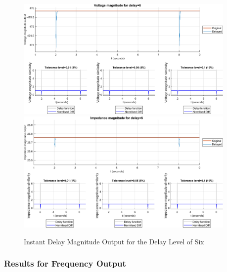 \begin{figure}
    \caption{Instant Delay Magnitude Output for the Delay Level of Six}
    \includegraphics[width=0.95\textwidth]{PMUsim-figures/DelayOf_6/Instant_vMagnitude.png}    
      \includegraphics[width=0.95\textwidth]{PMUsim-figures/DelayOf_6/Instant_iMagnitude.png}       \label{fig:PMUsim_Six_Magnitude}
    \begin{small}
     \end{small}
\end{figure}

\newpage \subsubsection{Results for Frequency Output}


